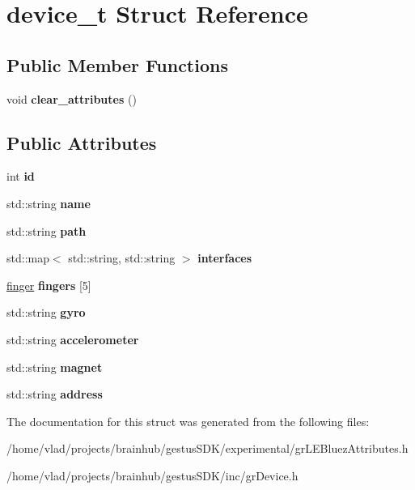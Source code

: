 \hypertarget{structdevice__t}{}\section{device\+\_\+t Struct Reference}
\label{structdevice__t}
\subsection*{Public Member Functions}
\begin{DoxyCompactItemize}
\item 
\mbox{\label{structdevice__t_ac77b0b37f8860be8c8ea2fc236e831c2}} 
void {\bfseries clear\+\_\+attributes} ()
\end{DoxyCompactItemize}
\subsection*{Public Attributes}
\begin{DoxyCompactItemize}
\item 
\mbox{\label{structdevice__t_ab6fb06faaf77e3218eba621ce4b9e156}} 
int {\bfseries id}
\item 
\mbox{\label{structdevice__t_adb384c5c8cb489d608dcb7b80a40b52c}} 
std\+::string {\bfseries name}
\item 
\mbox{\label{structdevice__t_ad45e01edbc70a12f18d72f3c62163a39}} 
std\+::string {\bfseries path}
\item 
\mbox{\label{structdevice__t_ae5757b3a9ade883619d106cd4b954ace}} 
std\+::map$<$ std\+::string, std\+::string $>$ {\bfseries interfaces}
\item 
\mbox{\label{structdevice__t_ab0380ed9060a37f112c867c7599e32e5}} 
\mbox{\hyperlink{structfinger}{finger}} {\bfseries fingers} \mbox{[}5\mbox{]}
\item 
\mbox{\label{structdevice__t_a95dd8a9f9684047daaf104b15ad18a73}} 
std\+::string {\bfseries gyro}
\item 
\mbox{\label{structdevice__t_a6a9af191647809104bb400e95cb94b0c}} 
std\+::string {\bfseries accelerometer}
\item 
\mbox{\label{structdevice__t_a520a7e5fb847c6b0eac507bfda8a5a2f}} 
std\+::string {\bfseries magnet}
\item 
\mbox{\label{structdevice__t_a3ebddb374c44b31ada528da828e0bcdf}} 
std\+::string {\bfseries address}
\end{DoxyCompactItemize}


The documentation for this struct was generated from the following files\+:\begin{DoxyCompactItemize}
\item 
/home/vlad/projects/brainhub/gestus\+S\+D\+K/experimental/gr\+L\+E\+Bluez\+Attributes.\+h\item 
/home/vlad/projects/brainhub/gestus\+S\+D\+K/inc/gr\+Device.\+h\end{DoxyCompactItemize}
